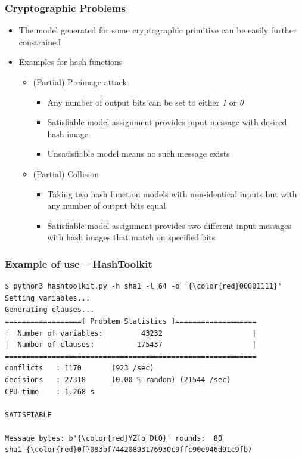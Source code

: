 \documentclass{beamer}
\let\olditem\item
\renewcommand{\item}{%
\olditem\vspace{4pt}}
\begin{document}
\begin{frame}
\frametitle{Cryptographic Problems}
\begin{itemize}
\item The model generated for some cryptographic primitive can be easily further constrained
\item Examples for hash functions
\begin{itemize}
\item (Partial) Preimage attack
\begin{itemize}
\item Any number of output bits can be set to either \textit{1} or \textit{0}
\item Satisfiable model assignment provides input message with desired hash image
\item Unsatisfiable model means no such message exists
\end{itemize}
\item (Partial) Collision
\begin{itemize}
\item Taking two hash function models with non-identical inputs but with any number of output bits equal
\item Satisfiable model assignment provides two different input messages with hash images that match on specified bits
\end{itemize}
\end{itemize}
\end{itemize}
\end{frame}

\begin{frame}[fragile]
\frametitle{Example of use -- HashToolkit}
\begin{Verbatim}[commandchars=\\\{\}]
$ python3 hashtoolkit.py -h sha1 -l 64 -o '{\color{red}00001111}'
Setting variables...
Generating clauses...
==================[ Problem Statistics ]===================
|  Number of variables:         43232                     |
|  Number of clauses:          175437                     |
===========================================================
conflicts   : 1170       (923 /sec)
decisions   : 27318      (0.00 % random) (21544 /sec)
CPU time    : 1.268 s

SATISFIABLE

Message bytes: b'{\color{red}YZ[o_DtQ}' rounds:  80
sha1 {\color{red}0f}083bf74420893176930c9ffc90e946d91c9fb7
\end{Verbatim}
\end{frame}
\end{document}
